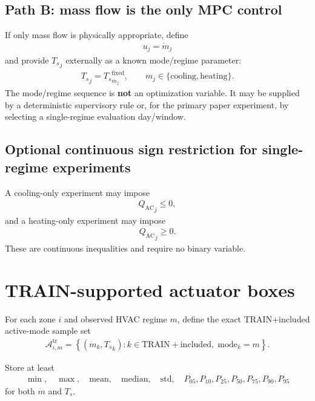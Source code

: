 \documentclass[11pt]{article}
\newcommand{\Ts}{T_s}
\newcommand{\mdot}{\dot m}
\newcommand{\QAC}{Q_{\mathrm{AC}}}
\begin{document}
\subsection{Path B: mass flow is the only MPC control}

If only mass flow is physically appropriate, define
\begin{align}
\boxed{u_j=\mdot_j}
\tag{6.31}
\end{align}
and provide \({\Ts}_j\) externally as a known mode/regime parameter:
\begin{align}
{\Ts}_j={\Ts}^{\mathrm{fixed}}_{m_j},
\qquad
m_j\in\{\mathrm{cooling},\mathrm{heating}\}.
\tag{6.32}
\end{align}
The mode/regime sequence is \textbf{not} an optimization variable.  It may be supplied by a
deterministic supervisory rule or, for the primary paper experiment, by selecting a
single-regime evaluation day/window.

\subsection{Optional continuous sign restriction for single-regime experiments}

A cooling-only experiment may impose
\begin{align}
{\QAC}_j\le0,
\tag{6.33}
\end{align}
and a heating-only experiment may impose
\begin{align}
{\QAC}_j\ge0.
\tag{6.34}
\end{align}
These are continuous inequalities and require no binary variable.

\section{TRAIN-supported actuator boxes}

For each zone \(i\) and observed HVAC regime \(m\), define the exact TRAIN+included active-mode
sample set
\begin{align}
\mathcal A_{i,m}^{\mathrm{tr}}
=
\left\{
(\mdot_k,{\Ts}_k):
k\in\mathrm{TRAIN+included},\;
\mathrm{mode}_k=m
\right\}.
\tag{6.35}
\end{align}

Store at least
\begin{align}
\min,\quad
\max,\quad
\mathrm{mean},\quad
\mathrm{median},\quad
\mathrm{std},\quad
P_{05},P_{10},P_{25},P_{50},P_{75},P_{90},P_{95}
\tag{6.36}
\end{align}
for both \(\mdot\) and \(\Ts\).
\end{document}
